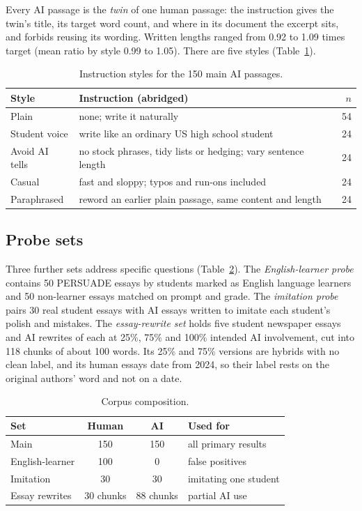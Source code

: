 \documentclass[conference]{IEEEtran}
\begin{document}
Every AI passage is the \emph{twin} of one human passage: the instruction gives the twin's title, its target word count, and where in its document the excerpt sits, and forbids reusing its wording. Written lengths ranged from 0.92 to 1.09 times target (mean ratio by style 0.99 to 1.05). There are five styles (Table~\ref{tab:styles}).

\begin{table}[t]
\caption{Instruction styles for the 150 main AI passages.}
\label{tab:styles}
\centering
\footnotesize
\begin{tabular}{@{}lp{5.1cm}r@{}}
\toprule
Style & Instruction (abridged) & $n$ \\
\midrule
Plain & none; write it naturally & 54 \\
Student voice & write like an ordinary US high school student & 24 \\
Avoid AI tells & no stock phrases, tidy lists or hedging; vary sentence length & 24 \\
Casual & fast and sloppy; typos and run-ons included & 24 \\
Paraphrased & reword an earlier plain passage, same content and length & 24 \\
\bottomrule
\end{tabular}
\end{table}

\subsection{Probe sets}
Three further sets address specific questions (Table~\ref{tab:corpus}). The \emph{English-learner probe} contains 50 PERSUADE essays by students marked as English language learners and 50 non-learner essays matched on prompt and grade. The \emph{imitation probe} pairs 30 real student essays with AI essays written to imitate each student's polish and mistakes. The \emph{essay-rewrite set} holds five student newspaper essays and AI rewrites of each at 25\%, 75\% and 100\% intended AI involvement, cut into 118 chunks of about 100 words. Its 25\% and 75\% versions are hybrids with no clean label, and its human essays date from 2024, so their label rests on the original authors' word and not on a date.

\begin{table}[t]
\caption{Corpus composition.}
\label{tab:corpus}
\centering
\footnotesize
\begin{tabular}{@{}lccp{2.9cm}@{}}
\toprule
Set & Human & AI & Used for \\
\midrule
Main & 150 & 150 & all primary results \\
English-learner & 100 & 0 & false positives \\
Imitation & 30 & 30 & imitating one student \\
Essay rewrites & 30 chunks & 88 chunks & partial AI use \\
\bottomrule
\end{tabular}
\end{table}
\end{document}
